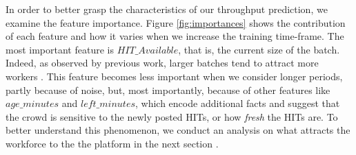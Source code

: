 In order to better grasp the characteristics of our throughput prediction, we examine the feature importance. Figure \ref{fig:importances} shows the  contribution of each feature and how it varies  when we increase the training time-frame.
The most important feature is $HIT\_Available$, that is, the current size of the batch. Indeed, as observed by previous work, larger batches tend to attract more workers \cite{mturk,crowddb}. This feature becomes less important when we consider longer periods, partly because of noise, but, most importantly, because of other features like $age\_minutes$ and $left\_minutes$, which encode additional facts and suggest that the crowd is sensitive to the newly posted HITs, or how \emph{fresh} the HITs are. To better understand this phenomenon, we conduct an analysis on what attracts the workforce to the the platform in the next section .

